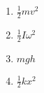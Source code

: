 

\vspace*{\fill}
\centering

\begin{enumerate}
    \item $\displaystyle \frac{1}{2} m v^2$ 
    \item $\displaystyle \frac{1}{2} I \omega^2$
    \item $\displaystyle mgh$
    \item $\displaystyle \frac{1}{2} k x^2$
\end{enumerate}

\centering
\vspace*{\fill}


